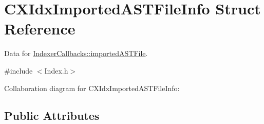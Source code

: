 \hypertarget{structCXIdxImportedASTFileInfo}{}\section{C\+X\+Idx\+Imported\+A\+S\+T\+File\+Info Struct Reference}
\label{structCXIdxImportedASTFileInfo}


Data for \hyperlink{structIndexerCallbacks_a75672a9934f69854080bee3fbc0e3994}{Indexer\+Callbacks\+::imported\+A\+S\+T\+File}.  




{\ttfamily \#include $<$Index.\+h$>$}



Collaboration diagram for C\+X\+Idx\+Imported\+A\+S\+T\+File\+Info\+:
\subsection*{Public Attributes}
